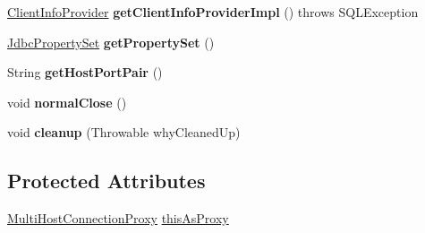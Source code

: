 \begin{DoxyCompactItemize}
$$\item 
\mbox{\label{classcom_1_1mysql_1_1cj_1_1jdbc_1_1ha_1_1_multi_host_my_s_q_l_connection_aa8c297293e99a34e78de7dd1cbaa6450}} 
\mbox{\hyperlink{interfacecom_1_1mysql_1_1cj_1_1jdbc_1_1_client_info_provider}{Client\+Info\+Provider}} {\bfseries get\+Client\+Info\+Provider\+Impl} ()  throws S\+Q\+L\+Exception 
\item 
\mbox{\label{classcom_1_1mysql_1_1cj_1_1jdbc_1_1ha_1_1_multi_host_my_s_q_l_connection_adc1a5c59c115064dc892d458337dd638}} 
\mbox{\hyperlink{interfacecom_1_1mysql_1_1cj_1_1jdbc_1_1_jdbc_property_set}{Jdbc\+Property\+Set}} {\bfseries get\+Property\+Set} ()
\item 
\mbox{\label{classcom_1_1mysql_1_1cj_1_1jdbc_1_1ha_1_1_multi_host_my_s_q_l_connection_aab6d43bb954ed5a08608412697c35c23}} 
String {\bfseries get\+Host\+Port\+Pair} ()
\item 
\mbox{\label{classcom_1_1mysql_1_1cj_1_1jdbc_1_1ha_1_1_multi_host_my_s_q_l_connection_a926772cecea56ad4444ebd84d576bdc4}} 
void {\bfseries normal\+Close} ()
\item 
\mbox{\label{classcom_1_1mysql_1_1cj_1_1jdbc_1_1ha_1_1_multi_host_my_s_q_l_connection_a60353fa7a398c8186c22a0ceba331655}} 
void {\bfseries cleanup} (Throwable why\+Cleaned\+Up)
\end{DoxyCompactItemize}
\subsection*{Protected Attributes}
\begin{DoxyCompactItemize}
\item 
\mbox{\hyperlink{classcom_1_1mysql_1_1cj_1_1jdbc_1_1ha_1_1_multi_host_connection_proxy}{Multi\+Host\+Connection\+Proxy}} \mbox{\hyperlink{classcom_1_1mysql_1_1cj_1_1jdbc_1_1ha_1_1_multi_host_my_s_q_l_connection_aa24e7362ca07c5968a5ecc7db8bbc841}{this\+As\+Proxy}}
\end{DoxyCompactItemize}


